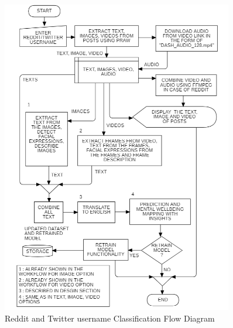 \clearpage
\vspace*{\fill}
\vspace{-1cm}
\begin{figure}[H]  
    \centering
    \includegraphics[width=0.9\textwidth]{Images/APP REDDIT.png}  
    \caption{Reddit and Twitter username Classification Flow Diagram}
    \label{01234i}  %
\end{figure}
\vspace*{\fill}
\clearpage

\pagebreak











